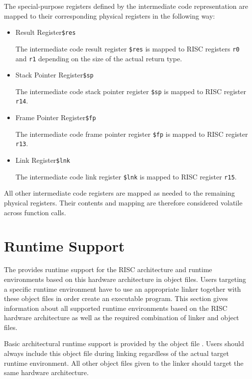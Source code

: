 The special-purpose registers defined by the intermediate code representation are mapped to their corresponding physical registers in the following way:

\begin{itemize}

\item Result Register\alignright\texttt{\$res}\nopagebreak

The intermediate code result register \texttt{\$res} is mapped to RISC registers \texttt{r0} and \texttt{r1} depending on the size of the actual return type.

\item Stack Pointer Register\alignright\texttt{\$sp}\nopagebreak

The intermediate code stack pointer register \texttt{\$sp} is mapped to RISC register \texttt{r14}.

\item Frame Pointer Register\alignright\texttt{\$fp}\nopagebreak

The intermediate code frame pointer register \texttt{\$fp} is mapped to RISC register \texttt{r13}.

\item Link Register\alignright\texttt{\$lnk}\nopagebreak

The intermediate code link register \texttt{\$lnk} is mapped to RISC register \texttt{r15}.

\end{itemize}

All other intermediate code registers are mapped as needed to the remaining physical registers.
Their contents and mapping are therefore considered volatile across function calls.

\section{Runtime Support}

The \ecs{} provides runtime support for the RISC architecture and runtime environments based on this hardware architecture in object files.
Users targeting a specific runtime environment have to use an appropriate linker together with these object files in order create an executable program.
This section gives information about all supported runtime environments based on the RISC hardware architecture as well as the required combination of linker and object files.

Basic architectural runtime support is provided by the object file .
Users should always include this object file during linking regardless of the actual target runtime environment.
All other object files given to the linker should target the same hardware architecture.

